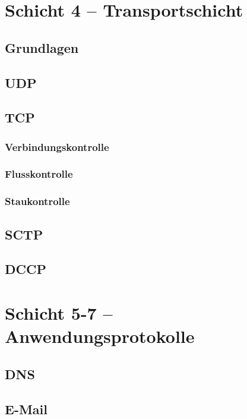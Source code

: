 \documentclass[a4paper,10pt]{scrartcl}
\begin{document}
\section{Schicht 4 -- Transportschicht}
\subsection{Grundlagen}
\subsection{UDP}
\subsection{TCP}
\subsubsection{Verbindungskontrolle}
\subsubsection{Flusskontrolle}
\subsubsection{Staukontrolle}
\subsection{SCTP}
\subsection{DCCP}

\section{Schicht 5-7 -- Anwendungsprotokolle}
\subsection{DNS}
\subsection{E-Mail}
\end{document}
